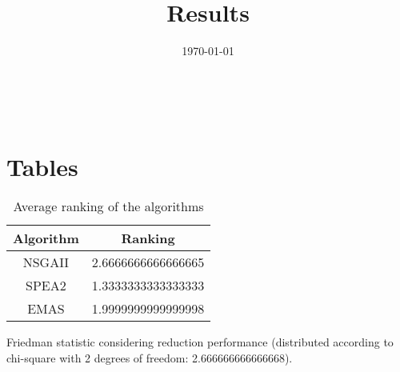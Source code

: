 \documentclass{article}
\title{Results}
\author{}
\date{\today}
\begin{document}
\oddsidemargin 0in \topmargin 0in\maketitle
\
\section{Tables}
\begin{table}[!htp]
\centering
\caption{Average ranking of the algorithms}
\begin{tabular}{c|c}
Algorithm&Ranking\\
\hline
NSGAII&2.6666666666666665\\
SPEA2&1.3333333333333333\\
EMAS&1.9999999999999998\\
\end{tabular}
\end{table}


Friedman statistic considering reduction performance (distributed according to chi-square with 2 degrees of freedom: 2.666666666666668).
\end{document}
